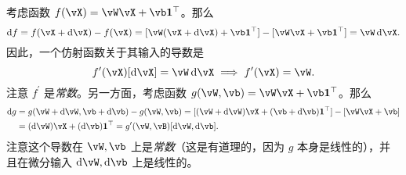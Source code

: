 \documentclass[../../book-main.tex]{subfiles}
\begin{document}
\begin{example}
    考虑函数 \(f(\vX) = \vW\vX + \vb\vone^{\top}\)。那么
    \begin{equation}
        \odif{f} = f(\vX + \odif{\vX}) - f(\vX) = [\vW(\vX + \odif{\vX}) + \vb\vone^{\top}] - [\vW \vX + \vb \vone^{\top}] = \vW\odif{\vX}.
    \end{equation}
    因此，一个仿射函数关于其输入的导数是
    \begin{equation}
        f^{\prime}(\vX)[\odif{\vX}] = \vW\odif{\vX} \implies f^{\prime}(\vX) = \vW.
    \end{equation}
    注意 \(f^{\prime}\) 是\textit{常数}。另一方面，考虑函数 \(g(\vW, \vb) = \vW\vX + \vb\vone^{\top}\)。那么
    \begin{align}
        \odif{g} 
        &= g(\vW + \odif{\vW}, \vb + \odif{\vb}) - g(\vW, \vb) = [(\vW + \odif{\vW})\vX + (\vb + \odif{\vb})\vone^{\top}] - [\vW\vX + \vb] \\
        &= (\odif{\vW})\vX + (\odif{\vb})\vone^{\top} = g^{\prime}(\vW, \vB)[\odif{\vW}, \odif{\vb}].
    \end{align}
    注意这个导数在 \(\vW, \vb\) 上是\textit{常数}（这是有道理的，因为 \(g\) 本身是线性的），并且在微分输入 \(\odif{\vW}, \odif{\vb}\) 上是线性的。
\end{example}
\end{document}
